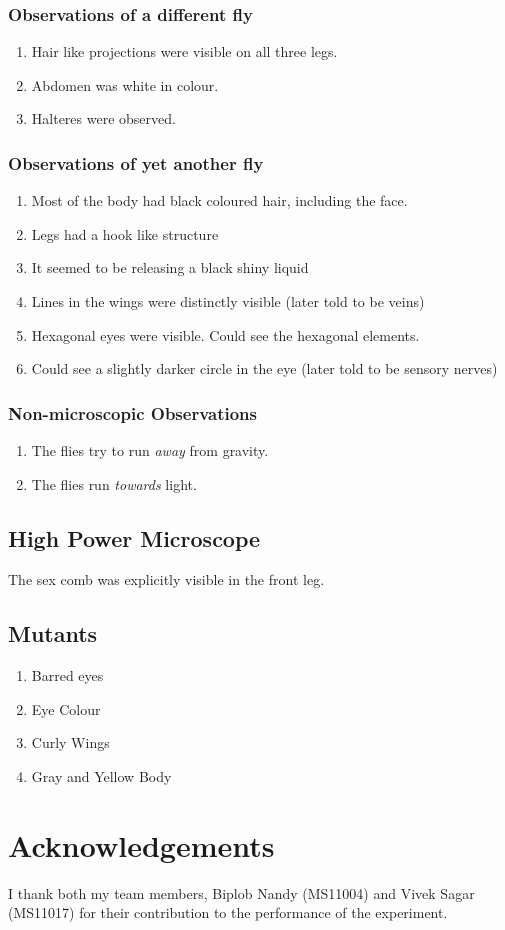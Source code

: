 		\subsubsection*{Observations of a different fly}
			\begin{enumerate}
				\item Hair like projections were visible on all three legs.
				\item Abdomen was white in colour.
				\item Halteres were observed.
			\end{enumerate}

		\subsubsection*{Observations of yet another fly}
			\begin{enumerate}
				\item Most of the body had black coloured hair, including the face.
				\item Legs had a hook like structure
				\item It seemed to be releasing a black shiny liquid
				\item Lines in the wings were distinctly visible (later told to be veins)
				\item Hexagonal eyes were visible. Could see the hexagonal elements.
				\item Could see a slightly darker circle in the eye (later told to be sensory nerves)
			\end{enumerate}

		\subsubsection*{Non-microscopic Observations}
			\begin{enumerate}
				\item The flies try to run \emph{away} from gravity.
				\item The flies run \emph{towards} light.
			\end{enumerate}
	\subsection{High Power Microscope}
		The sex comb was explicitly visible in the front leg.
	\subsection{Mutants}
		\begin{enumerate}
			\item Barred eyes
			\item Eye Colour
			\item Curly Wings
			\item Gray and Yellow Body
		\end{enumerate}
\section{Acknowledgements}
I thank both my team members, Biplob Nandy (MS11004) and Vivek Sagar (MS11017) for their contribution to the performance of the experiment. 